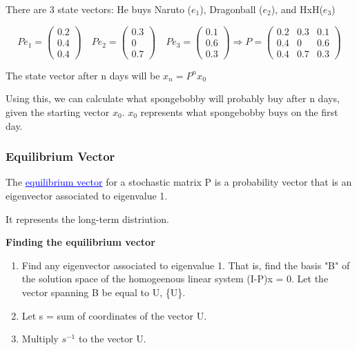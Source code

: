 \documentclass{article}
\newcommand{\bul}[1]{\textcolor{blue}{\underline{#1}}}
\newcommand{\sub}[1]{\vspace{10pt}\textbf{#1}}
\newcommand{\sbreak}{\vspace{10pt}}
\begin{document}
\sbreak
There are 3 state vectors: He buys Naruto ($e_1$), Dragonball ($e_2$), and HxH($e_3$)
\begin{center}
    \[
    Pe_1 = \begin{pmatrix}
        0.2\\
        0.4\\
        0.4
    \end{pmatrix} \quad 
    Pe_2 = \begin{pmatrix}
        0.3\\
        0\\
        0.7
    \end{pmatrix} \quad
    Pe_3 = \begin{pmatrix}
        0.1\\
        0.6\\
        0.3
    \end{pmatrix} \Rightarrow P = \begin{pmatrix}
        0.2 & 0.3 & 0.1\\
        0.4 & 0 & 0.6\\
        0.4 & 0.7 & 0.3
    \end{pmatrix}
    \]
\end{center}
The state vector after n days will be $x_n = P^nx_0$

Using this, we can calculate what spongebobby will probably buy after n days, given the starting vector $x_0$. $x_0$ represents what spongebobby buys on the first day.

\subsubsection{Equilibrium Vector}
The \bul{equilibrium vector} for a stochastic matrix P is a probability vector that is an eigenvector associated to eigenvalue 1.

It represents the long-term distriution.

\sub{Finding the equilibrium vector}
\begin{enumerate}
    \item Find any eigenvector associated to eigenvalue 1. That is, find the basis "B" of the solution space of the homogeenous linear system (I-P)x = 0. Let the vector spanning B be equal to U, \{U\}.
    \item Let s = sum of coordinates of the vector U.
    \item Multiply $s^{-1}$ to the vector U.
\end{enumerate}
\end{document}
